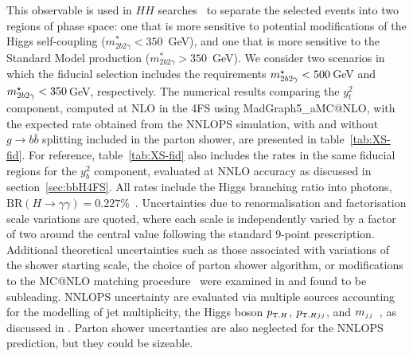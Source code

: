 \documentclass[11pt,a4paper]{article}
\begin{document}
This observable is used in $HH$ searches~\cite{HDBS-2021-10,HDBS-2019-27,CMS-HIG-19-018,ATLAS:2025hhd} to separate the selected events into two regions of phase space: one that is more sensitive to potential modifications of the Higgs self-coupling ($m_{2b2\gamma}^{*} < 350$~GeV), and one that is more sensitive to the Standard Model production ($m_{2b2\gamma}^{*} > 350$~GeV). We consider two scenarios in which the fiducial selection includes the requirements $m_{2b2\gamma}^{\star} < 500$\,GeV and $m_{2b2\gamma}^{\star} < 350$\,GeV, respectively. The numerical results comparing the \bbH{} $y_t^2$ component, computed at NLO in the 4FS using {\sc MadGraph5\_aMC@NLO}, with the expected rate obtained from the {\sc NNLOPS} simulation, with and without $g\rightarrow b\bar{b}$ splitting included in the parton shower, are presented in table~\ref{tab:XS-fid}. For reference, table~\ref{tab:XS-fid} also includes the rates in the same fiducial regions for the \bbH{} $y_b^2$ component, evaluated at NNLO accuracy as discussed in section~\ref{sec:bbH4FS}. All rates include the Higgs branching ratio into photons, $\textrm{BR}(H \to \gamma\gamma) = 0.227\%$~\cite{LHCHiggsCrossSectionWorkingGroup:2016ypw}. Uncertainties due to renormalisation and factorisation scale variations are quoted, where each scale is independently varied by a factor of two around the central value following the standard 9-point prescription. Additional theoretical uncertainties such as those associated with variations of the shower starting scale, the choice of parton shower algorithm, or modifications to the MC@NLO matching procedure~\cite{frixione:2002ik,frederix:2020trv} were examined in  and found to be subleading. {\sc NNLOPS} uncertainty
are evaluated via multiple sources accounting for the modelling of jet multiplicity, the Higgs boson $\ptH$, $\ptHjj$, and $\mjj$~\cite{deFlorian:2016spz,Liu:2013hba,stewart:2013faa,Boughezal:2013oha,Stewart:2011cf,Gangal:2013nxa}, as discussed in . Parton shower uncertanties are also neglected for the {\sc NNLOPS} prediction, but they could be sizeable. 
\end{document}
